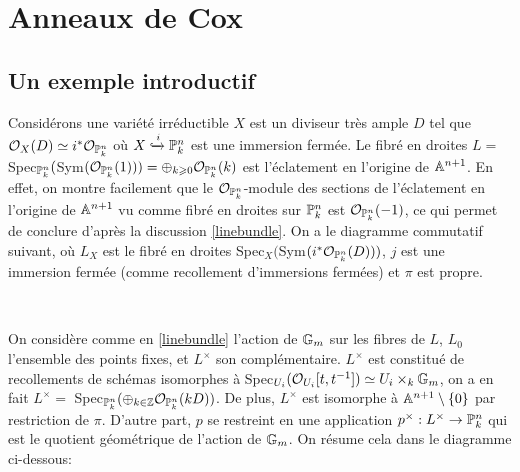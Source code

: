 \chapter{Anneaux de Cox}

\section{Un exemple introductif}




Considérons une variété irréductible $X$ est un diviseur très ample $D$ tel que $\mathcal{O}_X(D)\simeq i^*\mathcal{O}_{\mathbb{P}^n_k}$ où $X\xhookrightarrow{i}\mathbb{P}^n_k $ est une immersion fermée. Le fibré en droites $L=$ Spec$_{\mathbb{P}^n_k}($Sym$(\mathcal{O}_{\mathbb{P}^n_k}(1))) = \oplus_{k\geqslant 0}\mathcal{O}_{\mathbb{P}^n_k}(k)$ est l'éclatement en l'origine de $\mathbb{A}^{n+1}$. En effet, on montre facilement que le $\mathcal{O}_{\mathbb{P}^n_k}$-module des sections de l'éclatement en l'origine de $\mathbb{A}^{n+1}$ vu comme fibré en droites sur $\mathbb{P}_k^n$ est $ \mathcal{O}_{\mathbb{P}^n_k}(-1)$, ce qui permet de conclure d'après la discussion \ref{linebundle}. On a le diagramme commutatif suivant, où $L_X$ est le fibré en droites Spec$_X($Sym$(i^*\mathcal{O}_{\mathbb{P}^n_k}(D)))$, $j$ est une immersion fermée (comme recollement d'immersions fermées) et $\pi$ est propre.

	\begin{center}
	\\
	\end{center}


On considère comme en \ref{linebundle} l'action de $\mathbb{G}_m$ sur les fibres de $L$, $L_0$ l'ensemble des points fixes, et $L^\times$ son complémentaire. $L^\times$ est constitué de recollements de schémas isomorphes à Spec$_{U_i}( \mathcal{O}_{U_i}[t,t^{-1}])\simeq U_i \times_k \mathbb{G}_m$, on a en fait $L^\times=$ Spec$_{\mathbb{P}^n_k}(\oplus_{k\in \mathbb{Z}}\mathcal{O}_{\mathbb{P}^n_k}(kD))$. De plus, $L^\times$ est isomorphe à $\mathbb{A}^{n+1}\setminus\lbrace 0 \rbrace$ par restriction de $\pi$. D'autre part, $p$ se restreint en une application $p^\times:L^\times \rightarrow \mathbb{P}^n_k$ qui est le quotient géométrique de l'action de $\mathbb{G}_m$. On résume cela dans le diagramme ci-dessous:

	\begin{center}
	\\
	\end{center}

